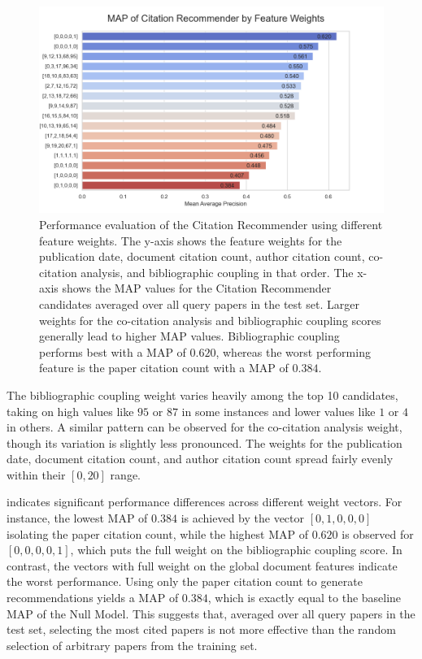 \begin{figure}[htb!]
    \centering
    \includegraphics[width=\textwidth]{plots/feature_weights.png}
    \caption[Feature Weights Evaluation]{Performance evaluation of the Citation Recommender using different feature weights. The y-axis shows the feature weights for the publication date, document citation count, author citation count, co-citation analysis, and bibliographic coupling in that order. The x-axis shows the \ac{MAP} values for the Citation Recommender candidates averaged over all query papers in the test set. Larger weights for the co-citation analysis and bibliographic coupling scores generally lead to higher \ac{MAP} values.
        Bibliographic coupling performs best with a \ac{MAP} of $0.620$, whereas the worst performing feature is the paper citation count with a \ac{MAP} of $0.384$.
    }
    \label{fig:feature-weights-evaluation}
\end{figure}

The bibliographic coupling weight varies heavily among the top 10 candidates, taking on high values like $95$ or $87$ in some instances and lower values like $1$ or $4$ in others.
A similar pattern can be observed for the co-citation analysis weight, though its variation is slightly less pronounced. The weights for the publication date, document citation count, and author citation count spread fairly evenly within their $[0, 20]$ range.

 indicates significant performance differences across different weight vectors.
For instance, the lowest \ac{MAP} of $0.384$ is achieved by the vector $[0, 1, 0, 0, 0]$ isolating the paper citation count, while the highest \ac{MAP} of $0.620$ is observed for $[0, 0, 0, 0, 1]$, which puts the full weight on the bibliographic coupling score.
In contrast, the vectors with full weight on the global document features indicate the worst performance. Using only the paper citation count to generate recommendations yields a \ac{MAP} of $0.384$, which is exactly equal to the baseline \ac{MAP} of the Null Model. This suggests that, averaged over all query papers in the test set, selecting the most cited papers is not more effective than the random selection of arbitrary papers from the training set.

